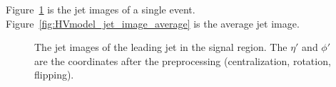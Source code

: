 \documentclass[12pt]{article}
\begin{document}
        Figure~\ref{fig:HVmodel_jet_image_one_event} is the jet images of a single event. Figure~\ref{fig:HVmodel_jet_image_average} is the average jet image. 

        \begin{figure}[htpb]
            \centering
            \caption{The jet images of the leading jet in the signal region. The $\eta'$ and $\phi'$ are the coordinates after the preprocessing (centralization, rotation, flipping).}
            \label{fig:HVmodel_jet_image_one_event}
        \end{figure}
\end{document}
